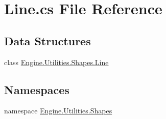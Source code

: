 \hypertarget{a00236}{}\section{Line.\+cs File Reference}
\label{a00236}
\subsection*{Data Structures}
\begin{DoxyCompactItemize}
\item 
class \hyperlink{a00606}{Engine.\+Utilities.\+Shapes.\+Line}
\end{DoxyCompactItemize}
\subsection*{Namespaces}
\begin{DoxyCompactItemize}
\item 
namespace \hyperlink{a00283}{Engine.\+Utilities.\+Shapes}
\end{DoxyCompactItemize}
